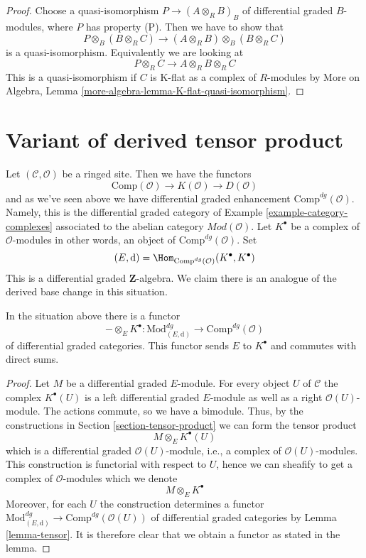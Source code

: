 \begin{proof}
Choose a quasi-isomorphism $P \to (A \otimes_R B)_B$ of differential
graded $B$-modules, where $P$ has property (P). Then we have to show
that
$$
P \otimes_B (B \otimes_R C) \longrightarrow
(A \otimes_R B) \otimes_B (B \otimes_R C)
$$
is a quasi-isomorphism. Equivalently we are looking at
$$
P \otimes_R C \longrightarrow
A \otimes_R B \otimes_R C
$$
This is a quasi-isomorphism if $C$ is K-flat as a complex of $R$-modules by
More on Algebra, Lemma \ref{more-algebra-lemma-K-flat-quasi-isomorphism}.
\end{proof}





\section{Variant of derived tensor product}
\label{section-variant-base-change}

\noindent
Let $(\mathcal{C}, \mathcal{O})$ be a ringed site. Then we have the functors
$$
\text{Comp}(\mathcal{O}) \to K(\mathcal{O}) \to D(\mathcal{O})
$$
and as we've seen above we have differential graded enhancement
$\text{Comp}^{dg}(\mathcal{O})$. Namely, this is the differential
graded category of Example \ref{example-category-complexes} associated
to the abelian category $\textit{Mod}(\mathcal{O})$.
Let $K^\bullet$ be a complex of $\mathcal{O}$-modules in other
words, an object of $\text{Comp}^{dg}(\mathcal{O})$. Set
$$
(E, \text{d}) =
\Hom_{\text{Comp}^{dg}(\mathcal{O})}(K^\bullet, K^\bullet)
$$
This is a differential graded $\mathbf{Z}$-algebra. We claim there is
an analogue of the derived base change in this situation.

\begin{lemma}
\label{lemma-tensor-with-complex}
In the situation above there is a functor
$$
- \otimes_E K^\bullet :
\text{Mod}^{dg}_{(E, \text{d})}
\longrightarrow
\text{Comp}^{dg}(\mathcal{O})
$$
of differential graded categories. This functor sends $E$ to $K^\bullet$
and commutes with direct sums.
\end{lemma}

\begin{proof}
Let $M$ be a differential graded $E$-module. For every object $U$ of
$\mathcal{C}$ the complex $K^\bullet(U)$ is a left differential
graded $E$-module as well as a right $\mathcal{O}(U)$-module.
The actions commute, so we have a bimodule.
Thus, by the constructions in Section \ref{section-tensor-product}
we can form the tensor product
$$
M \otimes_E K^\bullet(U)
$$
which is a differential graded $\mathcal{O}(U)$-module, i.e., a complex
of $\mathcal{O}(U)$-modules. This construction is functorial with respect
to $U$, hence we can sheafify to get a complex of $\mathcal{O}$-modules
which we denote
$$
M \otimes_E K^\bullet
$$
Moreover, for each $U$ the construction determines a functor
$\text{Mod}^{dg}_{(E, \text{d})} \to \text{Comp}^{dg}(\mathcal{O}(U))$
of differential graded categories by Lemma \ref{lemma-tensor}.
It is therefore clear that we obtain a functor as stated in the lemma.
\end{proof}

